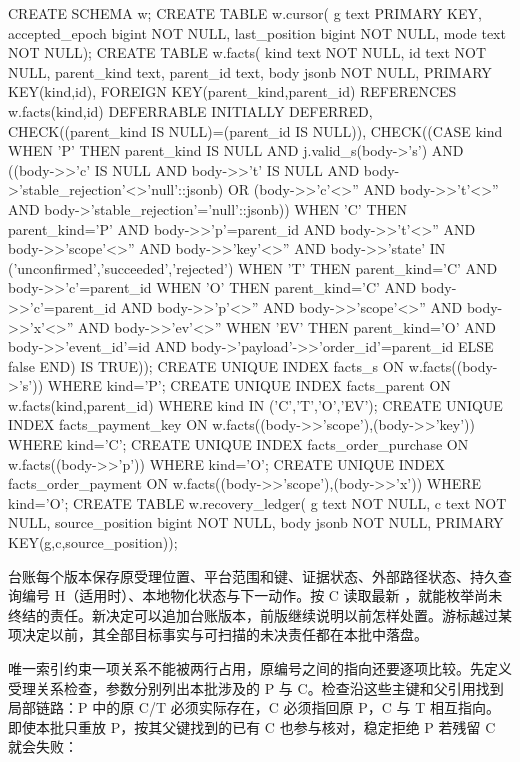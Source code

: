 \begin{BookCode}
CREATE SCHEMA w;
CREATE TABLE w.cursor(
 g text PRIMARY KEY, accepted_epoch bigint NOT NULL,
 last_position bigint NOT NULL, mode text NOT NULL);
CREATE TABLE w.facts(
 kind text NOT NULL, id text NOT NULL,
 parent_kind text, parent_id text, body jsonb NOT NULL,
 PRIMARY KEY(kind,id),
 FOREIGN KEY(parent_kind,parent_id) REFERENCES w.facts(kind,id)
 DEFERRABLE INITIALLY DEFERRED,
 CHECK((parent_kind IS NULL)=(parent_id IS NULL)),
 CHECK((CASE kind
   WHEN 'P' THEN parent_kind IS NULL AND j.valid_s(body->'s')
     AND ((body->>'c' IS NULL AND body->>'t' IS NULL
           AND body->'stable_rejection'<>'null'::jsonb)
       OR (body->>'c'<>'' AND body->>'t'<>''
           AND body->'stable_rejection'='null'::jsonb))
   WHEN 'C' THEN parent_kind='P'
     AND body->>'p'=parent_id AND body->>'t'<>''
     AND body->>'scope'<>'' AND body->>'key'<>''
     AND body->>'state' IN ('unconfirmed','succeeded','rejected')
   WHEN 'T' THEN parent_kind='C' AND body->>'c'=parent_id
   WHEN 'O' THEN parent_kind='C' AND body->>'c'=parent_id
     AND body->>'p'<>'' AND body->>'scope'<>'' AND body->>'x'<>''
     AND body->>'ev'<>''
   WHEN 'EV' THEN parent_kind='O' AND body->>'event_id'=id
     AND body->'payload'->>'order_id'=parent_id
   ELSE false END) IS TRUE));
CREATE UNIQUE INDEX facts_s ON w.facts((body->'s'))
 WHERE kind='P';
CREATE UNIQUE INDEX facts_parent ON w.facts(kind,parent_id)
 WHERE kind IN ('C','T','O','EV');
CREATE UNIQUE INDEX facts_payment_key
 ON w.facts((body->>'scope'),(body->>'key')) WHERE kind='C';
CREATE UNIQUE INDEX facts_order_purchase
 ON w.facts((body->>'p')) WHERE kind='O';
CREATE UNIQUE INDEX facts_order_payment
 ON w.facts((body->>'scope'),(body->>'x')) WHERE kind='O';
CREATE TABLE w.recovery_ledger(
 g text NOT NULL, c text NOT NULL, source_position bigint NOT NULL,
 body jsonb NOT NULL,
 PRIMARY KEY(g,c,source_position));
\end{BookCode}

台账每个版本保存原受理位置、平台范围和键、证据状态、外部路径状态、持久查询编号 H（适用时）、本地物化状态与下一动作。按 C 读取最新 ，就能枚举尚未终结的责任。新决定可以追加台账版本，前版继续说明以前怎样处置。游标越过某项决定以前，其全部目标事实与可扫描的未决责任都在本批中落盘。

唯一索引约束一项关系不能被两行占用，原编号之间的指向还要逐项比较。先定义受理关系检查，参数分别列出本批涉及的 P 与 C。检查沿这些主键和父引用找到局部链路：P 中的原 C/T 必须实际存在，C 必须指回原 P，C 与 T 相互指向。即使本批只重放 P，按其父键找到的已有 C 也参与核对，稳定拒绝 P 若残留 C 就会失败：

